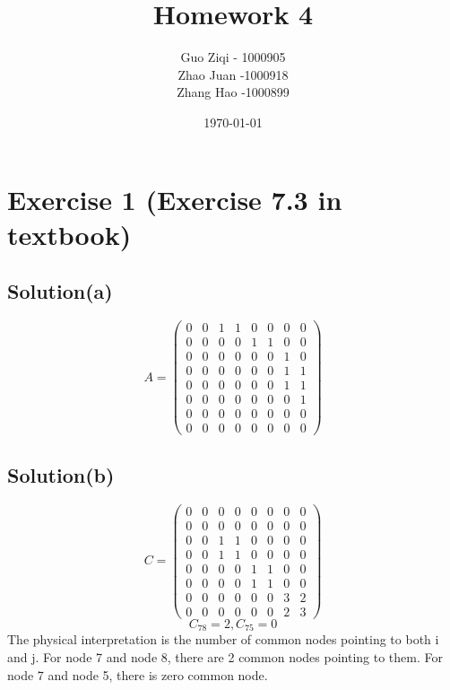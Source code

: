 \documentclass[12pt]{article}%
\begin{document}
\title{Homework 4}
\author{Guo Ziqi - 1000905\\Zhao Juan -1000918 \\Zhang Hao -1000899 }
\date{\today}
\maketitle
\section{Exercise 1 (Exercise 7.3 in textbook)}
\subsection{Solution(a)}
$$A = \left(\begin{matrix} 
0&0&1&1&0&0&0&0
\\ 0&0&0&0&1&1&0&0
\\0&0&0&0&0&0&1&0
\\0&0&0&0&0&0&1&1
\\0&0&0&0&0&0&1&1
\\0&0&0&0&0&0&0&1
\\0&0&0&0&0&0&0&0
\\0&0&0&0&0&0&0&0
 \end{matrix}\right)$$
\subsection{Solution(b)}
$$C = \left(\begin{matrix} 
0&0&0&0&0&0&0&0
\\0&0&0&0&0&0&0&0
\\0&0&1&1&0&0&0&0
\\0&0&1&1&0&0&0&0
\\0&0&0&0&1&1&0&0
\\0&0&0&0&1&1&0&0
\\0&0&0&0&0&0&3&2
\\0&0&0&0&0&0&2&3
 \end{matrix}\right)$$
 $$C_{78}=2, C_{75}=0$$ The physical interpretation is the number of common nodes pointing to both i and j. For node 7 and node 8, there are 2 common nodes pointing to them. For node 7 and node 5, there is zero common node.
\end{document}

